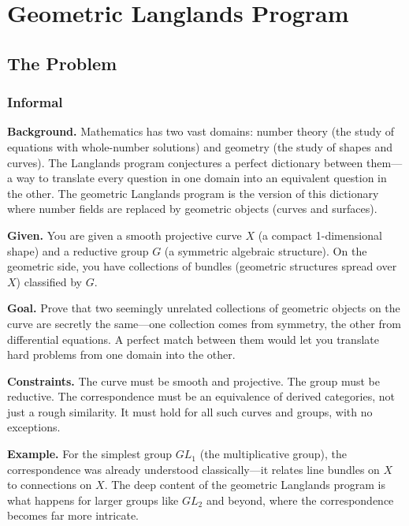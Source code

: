 \let\LocalMacro\relax

\chapter{Geometric Langlands Program}

\section{The Problem}

\subsection{Informal}

\textbf{Background.} Mathematics has two vast domains: number theory (the study of equations with whole-number solutions) and geometry (the study of shapes and curves). The Langlands program conjectures a perfect dictionary between them---a way to translate every question in one domain into an equivalent question in the other. The geometric Langlands program is the version of this dictionary where number fields are replaced by geometric objects (curves and surfaces).

\textbf{Given.} You are given a smooth projective curve $X$ (a compact 1-dimensional shape) and a reductive group $G$ (a symmetric algebraic structure). On the geometric side, you have collections of bundles (geometric structures spread over $X$) classified by $G$.

\textbf{Goal.} Prove that two seemingly unrelated collections of geometric objects on the curve are secretly the same---one collection comes from symmetry, the other from differential equations. A perfect match between them would let you translate hard problems from one domain into the other.

\textbf{Constraints.} The curve must be smooth and projective. The group must be reductive. The correspondence must be an equivalence of derived categories, not just a rough similarity. It must hold for all such curves and groups, with no exceptions.

\textbf{Example.} For the simplest group $GL_1$ (the multiplicative group), the correspondence was already understood classically---it relates line bundles on $X$ to connections on $X$. The deep content of the geometric Langlands program is what happens for larger groups like $GL_2$ and beyond, where the correspondence becomes far more intricate.

